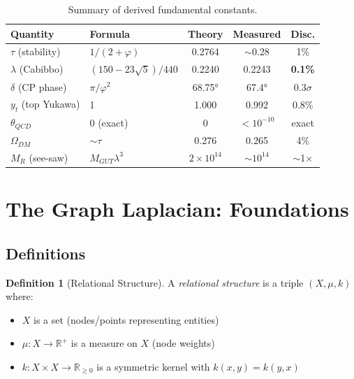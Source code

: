 \documentclass[11pt,a4paper]{article}
\theoremstyle{plain}
\theoremstyle{definition}
\newtheorem{definition}[theorem]{Definition}
\theoremstyle{remark}
\begin{document}
\begin{table}[H]
\centering
\begin{tabular}{@{}llccc@{}}
\toprule
\textbf{Quantity} & \textbf{Formula} & \textbf{Theory} & \textbf{Measured} & \textbf{Disc.} \\
\midrule
$\tau$ (stability) & $1/(2+\varphi)$ & 0.2764 & $\sim$0.28 & 1\% \\
$\lambda$ (Cabibbo) & $(150-23\sqrt{5})/440$ & 0.2240 & 0.2243 & \textbf{0.1\%} \\
$\delta$ (CP phase) & $\pi/\varphi^2$ & 68.75° & 67.4° & 0.3$\sigma$ \\
$y_t$ (top Yukawa) & 1 & 1.000 & 0.992 & 0.8\% \\
$\theta_{QCD}$ & 0 (exact) & 0 & $<10^{-10}$ & exact \\
$\Omega_{DM}$ & $\sim\tau$ & 0.276 & 0.265 & 4\% \\
$M_R$ (see-saw) & $M_{GUT}\lambda^3$ & $2\times10^{14}$ & $\sim10^{14}$ & $\sim$1$\times$ \\
\bottomrule
\end{tabular}
\caption{Summary of derived fundamental constants.}
\label{tab:summary}
\end{table}

\section{The Graph Laplacian: Foundations}

\subsection{Definitions}

\begin{definition}[Relational Structure]
A \emph{relational structure} is a triple $(X, \mu, k)$ where:
\begin{itemize}[noitemsep]
    \item $X$ is a set (nodes/points representing entities)
    \item $\mu: X \to \mathbb{R}^+$ is a measure on $X$ (node weights)
    \item $k: X \times X \to \mathbb{R}_{\geq 0}$ is a symmetric kernel with $k(x,y) = k(y,x)$
\end{itemize}
\end{definition}
\end{document}
